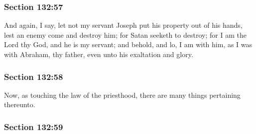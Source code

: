 
	\subsubsection{Section 132:57} %
		\label{DC132-57}

		And again, I say, let not my servant Joseph put his property out of his hands, lest an enemy come and destroy him; for Satan seeketh to destroy; for I am the Lord thy God, and he is my servant; and behold, and lo, I am with him, as I was with Abraham, thy father, even unto his exaltation and glory.


	\subsubsection{Section 132:58} %
		\label{DC132-58}

		Now, as touching the law of the priesthood, there are many things pertaining thereunto.


	\subsubsection{Section 132:59} %
		\label{DC132-59}

